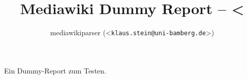 \documentclass{scrartcl}
\title{Mediawiki Dummy Report -- <%
}
\author{mediawikiparser (<\texttt{klaus.stein@uni-bamberg.de}>)}
\begin{document}
\maketitle

Ein Dummy-Report zum Testen.
\end{document}
